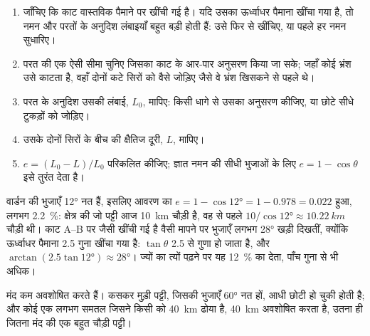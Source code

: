 \begin{method}[काट पर लघुकरण का मापन]\label{met:g12:mountain-building:shortening}
\begin{enumerate}
  \item जाँचिए कि काट वास्तविक पैमाने पर खींची गई है। यदि उसका ऊर्ध्वाधर पैमाना
        खींचा गया है, तो नमन और परतों के अनुदिश लंबाइयाँ बहुत बड़ी होती हैं: उसे
        फिर से खींचिए, या पहले हर नमन सुधारिए।
  \item परत की एक ऐसी सीमा चुनिए जिसका काट के आर-पार अनुसरण किया जा सके;
        जहाँ कोई भ्रंश उसे काटता है, वहाँ दोनों कटे सिरों को वैसे जोड़िए जैसे वे भ्रंश
        खिसकने से पहले थे।
  \item परत के अनुदिश उसकी लंबाई, $L_0$, मापिए: किसी धागे से उसका अनुसरण कीजिए,
        या छोटे सीधे टुकड़ों को जोड़िए।
  \item उसके दोनों सिरों के बीच की क्षैतिज दूरी, $L$, मापिए।
  \item $e = (L_0 - L)/L_0$ परिकलित कीजिए; ज्ञात नमन की सीधी भुजाओं के लिए
        $e = 1 - \cos\theta$ इसे तुरंत देता है।
\end{enumerate}
\end{method}

\begin{example}[वार्डन के वलन]\label{ex:g12:mountain-building:varden}
वार्डन  की भुजाएँ \ang{12} नत हैं, इसलिए आवरण का 
$e = 1 - \cos\ang{12} = 1 - 0.978 = 0.022$ हुआ, लगभग \qty{2.2}{\percent}: क्षेत्र की
जो पट्टी आज \qty{10}{km} चौड़ी है, वह  से पहले $10/\cos\ang{12} \approx
\qty{10.22}{km}$ चौड़ी थी। काट A--B पर जैसी खींची गई है वैसी मापने पर
भुजाएँ लगभग \ang{28} खड़ी दिखतीं, क्योंकि ऊर्ध्वाधर पैमाना
2.5 गुना खींचा गया है: $\tan\theta$ 2.5 से गुणा हो जाता है, और $\arctan(2.5
\tan\ang{12}) \approx \ang{28}$। ज्यों का त्यों पढ़ने पर यह
\qty{12}{\percent} का  देता, पाँच गुना से भी अधिक।
\end{example}

मंद  कम अवशोषित करते हैं। कसकर मुड़ी पट्टी, जिसकी भुजाएँ
\ang{60} नत हों, आधी छोटी हो चुकी होती है; और कोई एक लगभग समतल  जिसने
किसी  को \qty{40}{km} ढोया है, \qty{40}{km}  अवशोषित करता है, उतना ही
जितना मंद  की एक बहुत चौड़ी पट्टी।

